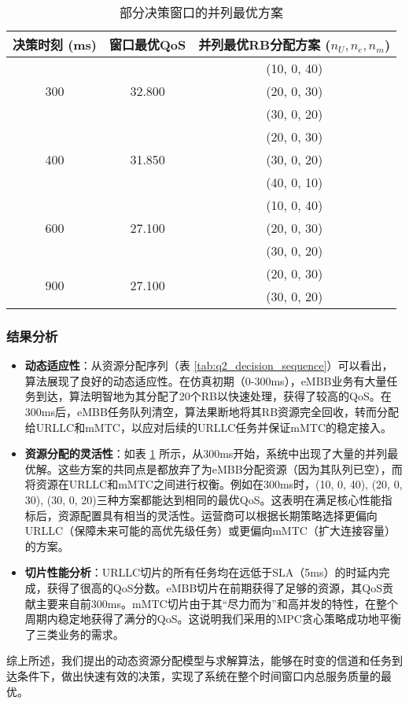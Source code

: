 \begin{table}[H]
\centering
\caption{部分决策窗口的并列最优方案}
\label{tab:q2_tie_solutions}
\begin{tabular}{ccc}
\hline
\textbf{决策时刻 (ms)} & \textbf{窗口最优QoS} & \textbf{并列最优RB分配方案 ($n_U, n_e, n_m$)} \\
\hline
\multirow{3}{*}{300} & \multirow{3}{*}{32.800} & (10, 0, 40) \\
 & & (20, 0, 30) \\
 & & (30, 0, 20) \\
\hline
\multirow{3}{*}{400} & \multirow{3}{*}{31.850} & (20, 0, 30) \\
 & & (30, 0, 20) \\
 & & (40, 0, 10) \\
\hline
\multirow{3}{*}{600} & \multirow{3}{*}{27.100} & (10, 0, 40) \\
 & & (20, 0, 30) \\
 & & (30, 0, 20) \\
\hline
\multirow{2}{*}{900} & \multirow{2}{*}{27.100} & (20, 0, 30) \\
 & & (30, 0, 20) \\
\hline
\end{tabular}
\end{table}

\subsubsection{结果分析}

\begin{itemize}
    \item \textbf{动态适应性}：从资源分配序列（表 \ref{tab:q2_decision_sequence}）可以看出，算法展现了良好的动态适应性。在仿真初期（0-300ms），eMBB业务有大量任务到达，算法明智地为其分配了20个RB以快速处理，获得了较高的QoS。在300ms后，eMBB任务队列清空，算法果断地将其RB资源完全回收，转而分配给URLLC和mMTC，以应对后续的URLLC任务并保证mMTC的稳定接入。
    \item \textbf{资源分配的灵活性}：如表 \ref{tab:q2_tie_solutions} 所示，从300ms开始，系统中出现了大量的并列最优解。这些方案的共同点是都放弃了为eMBB分配资源（因为其队列已空），而将资源在URLLC和mMTC之间进行权衡。例如在300ms时，(10, 0, 40), (20, 0, 30), (30, 0, 20)三种方案都能达到相同的最优QoS。这表明在满足核心性能指标后，资源配置具有相当的灵活性。运营商可以根据长期策略选择更偏向URLLC（保障未来可能的高优先级任务）或更偏向mMTC（扩大连接容量）的方案。
    \item \textbf{切片性能分析}：URLLC切片的所有任务均在远低于SLA（5ms）的时延内完成，获得了很高的QoS分数。eMBB切片在前期获得了足够的资源，其QoS贡献主要来自前300ms。mMTC切片由于其“尽力而为”和高并发的特性，在整个周期内稳定地获得了满分的QoS。这说明我们采用的MPC贪心策略成功地平衡了三类业务的需求。
\end{itemize}

综上所述，我们提出的动态资源分配模型与求解算法，能够在时变的信道和任务到达条件下，做出快速有效的决策，实现了系统在整个时间窗口内总服务质量的最优。